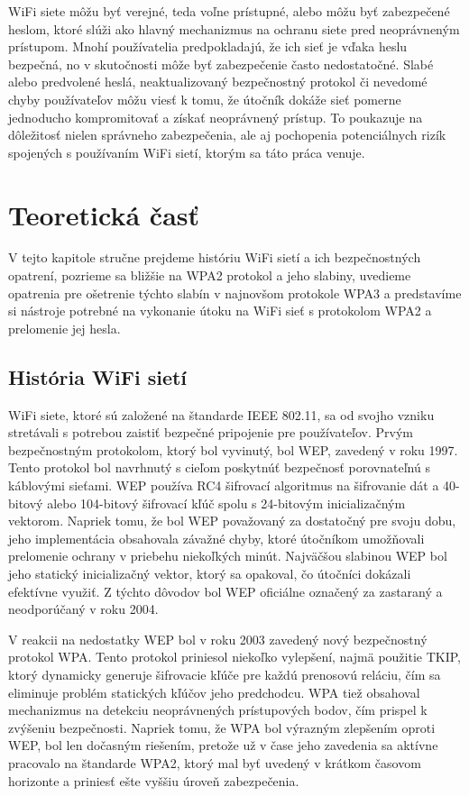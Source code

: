 \documentclass[12pt, twoside]{book}
\begin{document}
WiFi siete môžu byť verejné, teda voľne prístupné, alebo môžu byť zabezpečené heslom, ktoré slúži ako hlavný mechanizmus na ochranu siete pred neoprávneným prístupom. Mnohí používatelia predpokladajú, že ich sieť je vďaka heslu  bezpečná, no v skutočnosti môže byť zabezpečenie často nedostatočné. Slabé alebo predvolené heslá, neaktualizovaný bezpečnostný protokol či nevedomé chyby používateľov môžu viesť k tomu, že útočník dokáže sieť pomerne jednoducho kompromitovať a získať neoprávnený prístup. To poukazuje na dôležitosť nielen správneho zabezpečenia, ale aj pochopenia potenciálnych rizík spojených s používaním WiFi sietí, ktorým sa táto práca venuje.


\section{Teoretická časť}
V tejto kapitole stručne prejdeme históriu WiFi sietí a ich bezpečnostných opatrení, pozrieme sa bližšie na WPA2 protokol a jeho slabiny, uvedieme opatrenia pre ošetrenie týchto slabín v najnovšom protokole WPA3 a predstavíme si nástroje potrebné na vykonanie útoku na WiFi sieť s protokolom WPA2 a prelomenie jej hesla.

\subsection{História WiFi sietí}
WiFi siete, ktoré sú založené na štandarde IEEE 802.11, sa od svojho vzniku stretávali s potrebou zaistiť bezpečné pripojenie pre používateľov. Prvým bezpečnostným protokolom, ktorý bol vyvinutý, bol WEP, zavedený v roku 1997. Tento protokol bol navrhnutý s cieľom poskytnúť bezpečnosť porovnateľnú s káblovými sieťami. WEP používa RC4 šifrovací algoritmus na šifrovanie dát a 40-bitový alebo 104-bitový šifrovací kľúč spolu s 24-bitovým inicializačným vektorom.\cite{vseob_1, vseob_2} Napriek tomu, že bol WEP považovaný za dostatočný pre svoju dobu, jeho implementácia obsahovala závažné chyby, ktoré útočníkom umožňovali prelomenie ochrany v priebehu niekoľkých minút. Najväčšou slabinou WEP bol jeho statický inicializačný vektor, ktorý sa opakoval, čo útočníci dokázali efektívne využiť.\cite{slabiny_po_2, vseob_2} Z týchto dôvodov bol WEP oficiálne označený za zastaraný a neodporúčaný v roku 2004.

V reakcii na nedostatky WEP bol v roku 2003 zavedený nový bezpečnostný protokol WPA. Tento protokol priniesol niekoľko vylepšení, najmä použitie TKIP, ktorý dynamicky generuje šifrovacie kľúče pre každú prenosovú reláciu, čím sa eliminuje problém statických kľúčov jeho predchodcu.\cite{slabiny_po_2} WPA tiež obsahoval mechanizmus na detekciu neoprávnených prístupových bodov, čím prispel k zvýšeniu bezpečnosti. Napriek tomu, že WPA bol výrazným zlepšením oproti WEP, bol len dočasným riešením, pretože už v čase jeho zavedenia sa aktívne pracovalo na štandarde WPA2, ktorý mal byť uvedený v krátkom časovom horizonte a priniesť ešte vyššiu úroveň zabezpečenia.
\end{document}
